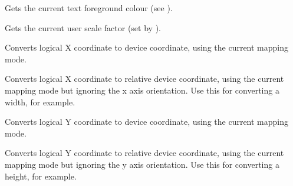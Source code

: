 

\label{wxdcgettextforeground}



Gets the current text foreground colour (see ).



\label{wxdcgetuserscale}


Gets the current user scale factor (set by ).



\label{wxdclogicaltodevicex}


Converts logical X coordinate to device coordinate, using the current
mapping mode.


\label{wxdclogicaltodevicexrel}


Converts logical X coordinate to relative device coordinate, using the current
mapping mode but ignoring the x axis orientation.
Use this for converting a width, for example.


\label{wxdclogicaltodevicey}


Converts logical Y coordinate to device coordinate, using the current
mapping mode.


\label{wxdclogicaltodeviceyrel}


Converts logical Y coordinate to relative device coordinate, using the current
mapping mode but ignoring the y axis orientation.
Use this for converting a height, for example.


